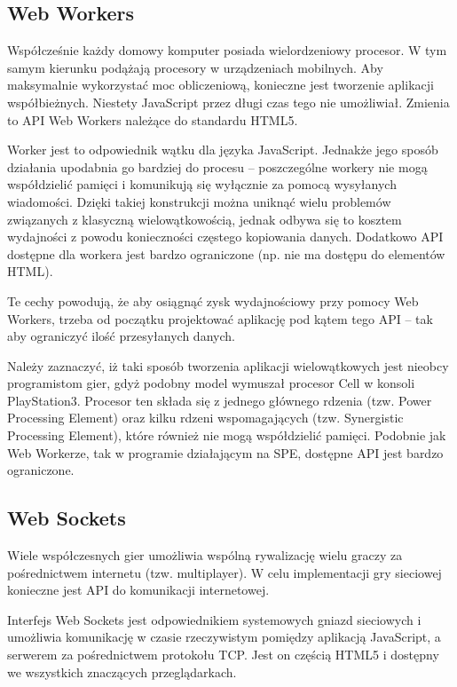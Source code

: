 \subsection{Web Workers}
\label{ssec:webWorkers}

Współcześnie każdy domowy komputer posiada wielordzeniowy procesor. W tym samym kierunku
podążają procesory w urządzeniach mobilnych. Aby maksymalnie wykorzystać moc obliczeniową,
konieczne jest tworzenie aplikacji współbieżnych. Niestety JavaScript przez długi czas
tego nie umożliwiał. Zmienia to API Web Workers należące do standardu HTML5.

Worker jest to odpowiednik wątku dla języka JavaScript. Jednakże jego sposób działania
upodabnia go bardziej do procesu -- poszczególne workery nie mogą współdzielić pamięci
i komunikują się wyłącznie za pomocą wysyłanych wiadomości. Dzięki takiej konstrukcji
można uniknąć wielu problemów związanych z klasyczną wielowątkowością, jednak odbywa
się to kosztem wydajności z powodu konieczności częstego kopiowania danych. Dodatkowo
API dostępne dla workera jest bardzo ograniczone (np. nie ma dostępu do elementów HTML).

Te cechy powodują, że aby osiągnąć zysk wydajnościowy przy pomocy Web Workers, trzeba od
początku projektować aplikację pod kątem tego API -- tak aby ograniczyć ilość przesyłanych
danych.

Należy zaznaczyć, iż taki sposób tworzenia aplikacji wielowątkowych jest nieobcy programistom
gier, gdyż podobny model wymuszał procesor Cell w konsoli PlayStation3. Procesor ten składa
się z jednego głównego rdzenia (tzw. Power Processing Element) oraz kilku rdzeni wspomagających
(tzw. Synergistic Processing Element), które również nie mogą współdzielić pamięci. Podobnie jak
Web Workerze, tak w programie działającym na SPE, dostępne API jest bardzo ograniczone.

\subsection{Web Sockets}
\label{ssec:webSockets}

Wiele współczesnych gier umożliwia wspólną rywalizację wielu graczy za pośrednictwem internetu
(tzw. multiplayer). W celu implementacji gry sieciowej konieczne jest API do komunikacji
internetowej.

Interfejs Web Sockets jest odpowiednikiem systemowych gniazd sieciowych i umożliwia komunikację
w czasie rzeczywistym pomiędzy aplikacją JavaScript, a serwerem za pośrednictwem protokołu TCP.
Jest on częścią HTML5 i dostępny we wszystkich znaczących przeglądarkach.

